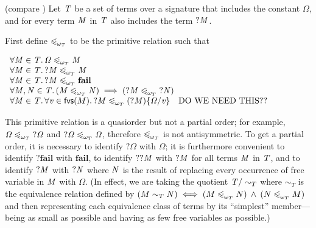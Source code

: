 \begin{definition}
(compare \cite[Definition 2.3]{ariola:skew-confluence})
Let \ensuremath{\Conid{T}} be a set of terms over a signature that includes the constant \ensuremath{\mathit{\Omega}}, and for every term \ensuremath{\Conid{M}} in \ensuremath{\Conid{T}} also includes the term \ensuremath{\mathbin{?}\Conid{M}}.

First define $\urleqomegaof{T}$ to be the primitive relation such that
\begin{center}
$\begin{array}{l}
\forall \ensuremath{\Conid{M}} \in \ensuremath{\Conid{T}} \suchthat \ensuremath{\mathit{\Omega}} \urleqomegaof{T} \ensuremath{\Conid{M}} \\
\forall \ensuremath{\Conid{M}} \in \ensuremath{\Conid{T}} \suchthat {\ensuremath{\mathbin{?}\Conid{M}}} \urleqomegaof{T} \ensuremath{\Conid{M}} \\
\forall \ensuremath{\Conid{M}} \in \ensuremath{\Conid{T}} \suchthat {\ensuremath{\mathbin{?}\Conid{M}}} \urleqomegaof{T} \ensuremath{\textbf{fail}} \\
\forall \ensuremath{\Conid{M}}, \ensuremath{\Conid{N}} \in \ensuremath{\Conid{T}} \suchthat (\ensuremath{\Conid{M}} \urleqomegaof{T} \ensuremath{\Conid{N}}) \implies (\ensuremath{\mathbin{?}\Conid{M}} \urleqomegaof{T} \ensuremath{\mathbin{?}\Conid{N}}) \\
\forall \ensuremath{\Conid{M}} \in \ensuremath{\Conid{T}} \suchthat \forall \ensuremath{\Varid{v}} \in \freevars{M} \suchthat {\ensuremath{\mathbin{?}\Conid{M}}} \urleqomegaof{T} \ensuremath{\subst{(\mathbin{?}\Conid{M})}{\Varid{v}}{\mathit{\Omega}}} \text{\quad DO WE NEED THIS??} \\
\end{array}$
\end{center}
This primitive relation is a quasiorder but not a partial order; for example,  $\ensuremath{\mathit{\Omega}} \urleqomegaof{T} \ensuremath{\mathbin{?}\mathit{\Omega}}$ and $\ensuremath{\mathbin{?}\mathit{\Omega}} \urleqomegaof{T} \ensuremath{\mathit{\Omega}}$,
therefore $\urleqomegaof{T}$ is not antisymmetric. To get a partial order, it is necessary to identify \ensuremath{\mathbin{?}\mathit{\Omega}} with \ensuremath{\mathit{\Omega}}; it is furthermore convenient to identify \ensuremath{\mathbin{?}\textbf{fail}} with \ensuremath{\textbf{fail}},
to identify
\ensuremath{\mathbin{??}\Conid{M}} with \ensuremath{\mathbin{?}\Conid{M}} for all terms \ensuremath{\Conid{M}} in \ensuremath{\Conid{T}}, and to identify \ensuremath{\mathbin{?}\Conid{M}} with \ensuremath{\mathbin{?}\Conid{N}} where \ensuremath{\Conid{N}} is the result of replacing every occurrence of free variable in \ensuremath{\Conid{M}} with \ensuremath{\mathit{\Omega}}.
(In effect, we are taking the quotient $\mathit{T} / \sim_T$ where $\sim_T$ is the equivalence relation defined by $(M \sim_T N) \iff (M \urleqomegaof{T} N) \logand (N \urleqomegaof{T} M)$
and then representing each equivalence class of terms by its ``simplest'' member---being as small as possible and having as few free variables as possible.)


\end{definition}
